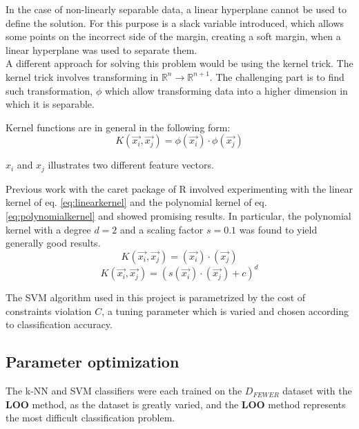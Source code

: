 In the case of non-linearly separable data,
a linear hyperplane cannot be used 
to define the solution. 
For this purpose is a slack variable introduced, which allows some points on the 
incorrect side of the margin, creating a soft margin, when a linear hyperplane 
was used to separate them.\\

A different approach for solving this problem would be using the kernel trick. 
The kernel trick involves transforming in $\mathbb{R}^n \rightarrow 
\mathbb{R}^{n+1}$. 
The challenging part is to find such transformation, $\phi$ which allow 
transforming data into a higher dimension in which it is separable. 

Kernel functions are in general in the following form:
\begin{equation}
K(\overrightarrow{x_i},\overrightarrow{x_j}) = \phi(\overrightarrow{x_i}) \cdot 
\phi(\overrightarrow{x_j}) 
\end{equation}

$x_i$ and $x_j$ illustrates two different feature vectors.

Previous work with the caret package of R
involved experimenting with the linear kernel of eq. \eqref{eq:linearkernel}
and the polynomial kernel of eq. \eqref{eq:polynomialkernel}
and showed promising results.
In particular, the polynomial kernel with a degree \(d=2\)
and a scaling factor \(s=0.1\) was found to yield generally good results.
\begin{equation}
K(\overrightarrow{x_i},\overrightarrow{x_j}) = (\overrightarrow{x_i}) \cdot 
(\overrightarrow{x_j})
\label{eq:linearkernel} 
\end{equation}
\begin{equation}
K(\overrightarrow{x_i},\overrightarrow{x_j}) = (s(\overrightarrow{x_i}) \cdot 
(\overrightarrow{x_j})+c)^d
\label{eq:polynomialkernel}
\end{equation}

The SVM algorithm used in this project is parametrized
by the cost of constraints violation \(C\),
a tuning parameter which is varied and chosen
according to classification accuracy.

\subsection{Parameter optimization}
The k-NN and SVM classifiers were each trained on the \(D_{FEWER}\)
dataset with the \textbf{LOO} method, as the dataset
is greatly varied, and the \textbf{LOO} method
represents the most difficult classification problem.

